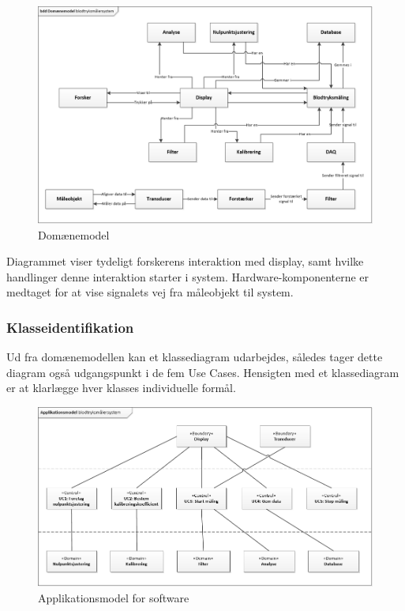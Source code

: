 \begin{figure}[H]
	\centering
	\includegraphics[width=1.0\textwidth]{Figurer/DomaneModel}
	\caption{Domænemodel}
\end{figure}

Diagrammet viser tydeligt forskerens interaktion med display, samt hvilke handlinger denne interaktion starter i system. Hardware-komponenterne er medtaget for at vise signalets vej fra måleobjekt til system. 

\subsubsection{Klasseidentifikation}
Ud fra domænemodellen kan et klassediagram udarbejdes, således tager dette diagram også udgangspunkt i de fem Use Cases. Hensigten med et klassediagram er at klarlægge hver klasses individuelle formål. 

\begin{figure}[H]
	\centering
	\includegraphics[width=1.0\textwidth]{Figurer/Applikationsmodel}
	\caption{Applikationsmodel for software}
\end{figure}

